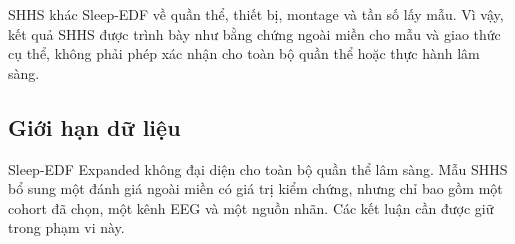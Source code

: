 SHHS khác Sleep-EDF về quần thể, thiết bị, montage và tần số lấy mẫu. Vì vậy, kết quả SHHS được trình bày như bằng chứng ngoài miền cho mẫu và giao thức cụ thể, không phải phép xác nhận cho toàn bộ quần thể hoặc thực hành lâm sàng.

\subsection{Giới hạn dữ liệu}

Sleep-EDF Expanded không đại diện cho toàn bộ quần thể lâm sàng. Mẫu SHHS bổ sung một đánh giá ngoài miền có giá trị kiểm chứng, nhưng chỉ bao gồm một cohort đã chọn, một kênh EEG và một nguồn nhãn. Các kết luận cần được giữ trong phạm vi này.
